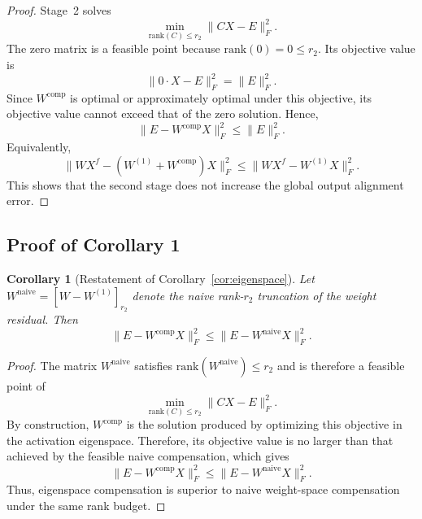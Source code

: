 \documentclass[a4paper,fleqn]{cas-dc}
\newtheorem*{corollary*}{Corollary}
\begin{document}
\begin{proof}
Stage~2 solves
\begin{equation}
\min_{\mathrm{rank}(C)\le r_2} \|CX-E\|_F^2.
\end{equation}
The zero matrix is a feasible point because $\mathrm{rank}(0)=0\le r_2$. Its objective value is
\begin{equation}
\|0\cdot X - E\|_F^2 = \|E\|_F^2.
\end{equation}
Since $W^{\mathrm{comp}}$ is optimal or approximately optimal under this objective, its objective value cannot exceed that of the zero solution. Hence,
\begin{equation}
\|E - W^{\mathrm{comp}}X\|_F^2 \le \|E\|_F^2.
\end{equation}
Equivalently,
\begin{equation}
\|WX^f - (W^{(1)} + W^{\mathrm{comp}})X\|_F^2
\le
\|WX^f - W^{(1)}X\|_F^2.
\end{equation}
This shows that the second stage does not increase the global output alignment error.
\end{proof}

\subsection{Proof of Corollary 1}\label{app:proof-corollary1}

\begin{corollary*}[Restatement of Corollary~\ref{cor:eigenspace}]
Let $W^{\mathrm{naive}} = [W-W^{(1)}]_{r_2}$ denote the naive rank-$r_2$ truncation of the weight residual. Then
\begin{equation}
\|E - W^{\mathrm{comp}}X\|_F^2 \le \|E - W^{\mathrm{naive}}X\|_F^2.
\end{equation}
\end{corollary*}

\begin{proof}
The matrix $W^{\mathrm{naive}}$ satisfies $\mathrm{rank}(W^{\mathrm{naive}})\le r_2$ and is therefore a feasible point of
\begin{equation}
\min_{\mathrm{rank}(C)\le r_2} \|CX-E\|_F^2.
\end{equation}
By construction, $W^{\mathrm{comp}}$ is the solution produced by optimizing this objective in the activation eigenspace. Therefore, its objective value is no larger than that achieved by the feasible naive compensation, which gives
\begin{equation}
\|E - W^{\mathrm{comp}}X\|_F^2 \le \|E - W^{\mathrm{naive}}X\|_F^2.
\end{equation}
Thus, eigenspace compensation is superior to naive weight-space compensation under the same rank budget.
\end{proof}
\end{document}
